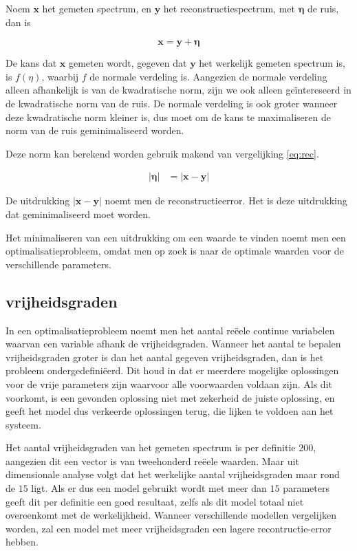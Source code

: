 \documentclass[12pt]{report}
\begin{document}
Noem $\bm{x}$ het gemeten spectrum, en $\bm{y}$ het reconstructiespectrum, met $\bm{\eta}$ de ruis, dan is

\begin{equation}\label{eq:rec}
\bm{x} = \bm{y} + \bm{\eta}
\end{equation}

De kans dat $\bm{x}$ gemeten wordt, gegeven dat $\bm{y}$ het werkelijk gemeten spectrum is, is $f(\eta)$, waarbij $f$ de normale verdeling is. Aangezien de normale verdeling alleen afhankelijk is van de kwadratische norm, zijn we ook alleen ge\"intereseerd in de kwadratische norm van de ruis. De normale verdeling is ook groter wanneer deze kwadratische norm kleiner is, dus moet om de kans te maximaliseren de norm van de ruis geminimaliseerd worden. 

Deze norm kan berekend worden gebruik makend van vergelijking \ref{eq:rec}.

\begin{eqnarray}
\left|\bm{\eta}\right| &= \left|\bm{x} - \bm{y}\right|
\end{eqnarray}

De uitdrukking $\left|\bm{x} - \bm{y}\right|$ noemt men de reconstructieerror. Het is deze uitdrukking dat geminimaliseerd moet worden.

Het minimaliseren van een uitdrukking om een waarde te vinden noemt men een optimalisatieprobleem, omdat men op zoek is naar de optimale waarden voor de verschillende parameters.

\subsection{vrijheidsgraden}

In een optimalisatieprobleem noemt men het aantal re\"eele continue variabelen waarvan een variable afhank de vrijheidsgraden. Wanneer het aantal te bepalen vrijheidsgraden groter is dan het aantal gegeven vrijheidsgraden, dan is het probleem ondergedefini\"eerd. Dit houd in dat er meerdere mogelijke oplossingen voor de vrije parameters zijn waarvoor alle voorwaarden voldaan zijn. Als dit voorkomt, is een gevonden oplossing niet met zekerheid de juiste oplossing, en geeft het model dus verkeerde oplossingen terug, die lijken te voldoen aan het systeem.

Het aantal vrijheidsgraden van het gemeten spectrum is per definitie $200$, aangezien dit een vector is van tweehonderd re\"eele waarden. Maar uit dimensionale analyse volgt dat het werkelijke aantal vrijheidsgraden maar rond de $15$ ligt. Als er dus een model gebruikt wordt met meer dan $15$ parameters geeft dit per definitie een goed resultaat, zelfs als dit model totaal niet overeenkomt met de werkelijkheid. Wanneer verschillende modellen vergelijken worden, zal een model met meer vrijheidsgraden een lagere recontructie-error hebben.  
\end{document}
